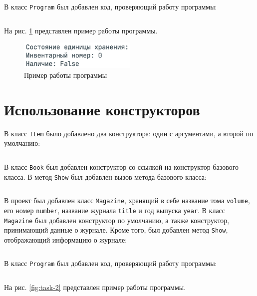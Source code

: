 \documentclass[a4paper,14pt]{extarticle}
\numberwithin{figure}{section}
\begin{document}
\inputminted{csharp}{../MyClass/MyClass/Book.cs}

В класс \texttt{Program} был добавлен код, проверяющий работу программы:

\inputminted{csharp}{../MyClass/MyClass/Program.cs}

На рис. \ref{fig:task-1} представлен пример работы программы.

\begin{figure}[H]
    \centering
    \includegraphics[width=0.5\textwidth]{images/task-1.png}
    \caption{Пример работы программы}
    \label{fig:task-1}
\end{figure}

\section{Использование конструкторов}

В класс \texttt{Item} было добавлено два конструктора: один с аргументами, а второй по умолчанию:

\inputminted{csharp}{../MyClass1/MyClass/Item.cs}

В класс \texttt{Book} был добавлен конструктор со ссылкой на конструктор базового класса. В метод \texttt{Show} был добавлен вызов метода базового класса:

\inputminted{csharp}{../MyClass1/MyClass/Book.cs}

В проект был добавлен класс \texttt{Magazine}, хранящий в себе название тома \texttt{volume}, его номер \texttt{number}, название журнала \texttt{title} и год выпуска \texttt{year}. В класс \texttt{Magazine} был добавлен конструктор по умолчанию, а также конструктор, принимающий данные о журнале. Кроме того, был добавлен метод \texttt{Show}, отображающий информацию о журнале:

\inputminted{csharp}{../MyClass1/MyClass/Magazine.cs}

В класс \texttt{Program} был добавлен код, проверяющий работу программы:

\inputminted{csharp}{../MyClass1/MyClass/Program.cs}

На рис. \ref{fig:task-2} представлен пример работы программы.
\end{document}
